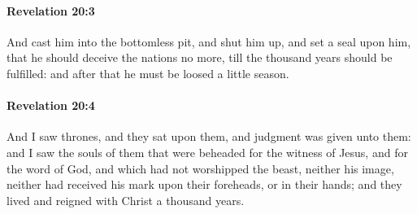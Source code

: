 		\paragraph{Revelation 20:3} %
			\label{REVELATIONNT-20-3}

			And cast him into the bottomless pit, and shut him up, and set a seal upon him, that he should deceive the nations no more, till the thousand years should be fulfilled: and after that he must be loosed a little season.

			\begin{framed}
			\scriptsize
				\begin{compactdesc}
					\item[SBLG] 
				\end{compactdesc}
			\end{framed}

		\paragraph{Revelation 20:4} %
			\label{REVELATIONNT-20-4}

			And I saw thrones, and they sat upon them, and judgment was given unto them: and I saw the souls of them that were beheaded for the witness of Jesus, and for the word of God, and which had not worshipped the beast, neither his image, neither had received his mark upon their foreheads, or in their hands; and they lived and reigned with Christ a thousand years.

